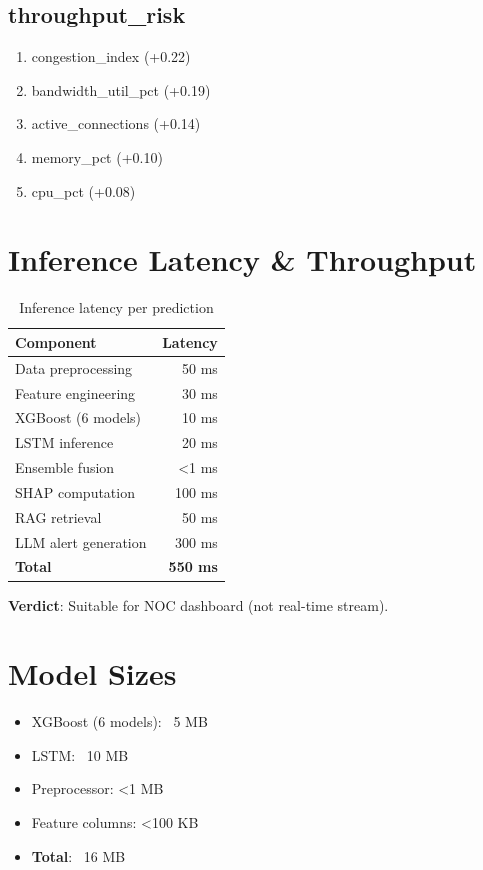 \documentclass[11pt,a4paper,oneside]{report}
\begin{document}
\subsection{throughput\_risk}
\begin{enumerate}
    \item congestion\_index (+0.22)
    \item bandwidth\_util\_pct (+0.19)
    \item active\_connections (+0.14)
    \item memory\_pct (+0.10)
    \item cpu\_pct (+0.08)
\end{enumerate}

\section{Inference Latency \& Throughput}

\begin{table}[h]
\centering
\begin{tabular}{lr}
\toprule
\textbf{Component} & \textbf{Latency} \\
\midrule
Data preprocessing & 50 ms \\
Feature engineering & 30 ms \\
XGBoost (6 models) & 10 ms \\
LSTM inference & 20 ms \\
Ensemble fusion & <1 ms \\
SHAP computation & 100 ms \\
RAG retrieval & 50 ms \\
LLM alert generation & 300 ms \\
\midrule
\textbf{Total} & \textbf{~550 ms} \\
\bottomrule
\end{tabular}
\caption{Inference latency per prediction}
\end{table}

\textbf{Verdict}: Suitable for NOC dashboard (not real-time stream).

\section{Model Sizes}

\begin{itemize}
    \item XGBoost (6 models): ~5 MB
    \item LSTM: ~10 MB
    \item Preprocessor: <1 MB
    \item Feature columns: <100 KB
    \item \textbf{Total}: ~16 MB
\end{itemize}
\end{document}
